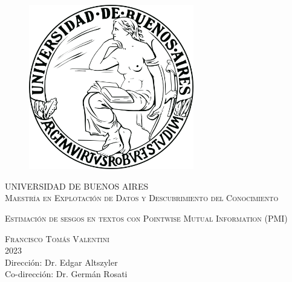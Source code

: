

\vspace{28.5mm}
\begin{figure}[h]
    \begin{center}
        \includegraphics[width=72mm]{img/institucional/logo-uba.png}
    \end{center}
\end{figure}


\begin{center}



\textsc{\Large UNIVERSIDAD DE BUENOS AIRES}\\[2em]

\textsc{\Large Maestría en Explotación de Datos y Descubrimiento del Conocimiento}\\[4em]

\vspace{15mm}
\begin{spacing}{1.5}
    \textsc{\LARGE {Estimación de sesgos en textos con Pointwise Mutual Information (PMI)}}
\end{spacing}

\vspace{30mm}
\textsc{\Large Francisco Tomás Valentini}\\[1em]
\textsc{\Large 2023}\\[1em]

\large Dirección: Dr. Edgar Altszyler \\
\large Co-dirección: Dr. Germán Rosati


\end{center}

\vspace*{\fill}


